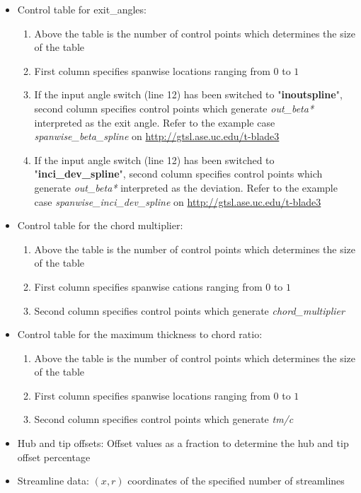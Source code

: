 \documentclass[8pt]{article}
\begin{document}
\begin{itemize}[leftmargin=*]
\begin{enumerate}[label=\alph*]
    \end{enumerate}
    \item Control table for exit\_angles:
    \begin{enumerate}[label=\alph*]
        \item Above the table is the number of control points which determines the size of the table
        \item First column specifies spanwise locations ranging from $0$ to $1$
        \item If the input angle switch (line 12) has been switched to "\textbf{inoutspline}", second column specifies control points which generate \textit{out\_beta*} interpreted as the exit angle. Refer to the example case \textit{spanwise\_beta\_spline} on \url{http://gtsl.ase.uc.edu/t-blade3}
        \item If the input angle switch (line 12) has been switched to "\textbf{inci\_dev\_spline}", second column specifies control points which generate \textit{out\_beta*} interpreted as the deviation. Refer to the example case \textit{spanwise\_inci\_dev\_spline} on \url{http://gtsl.ase.uc.edu/t-blade3}
    \end{enumerate}
    \item Control table for the chord multiplier:
    \begin{enumerate}[label=\alph*]
        \item Above the table is the number of control points which determines the size of the table
        \item First column specifies spanwise cations ranging from $0$ to $1$
        \item Second column specifies control points which generate \textit{chord\_multiplier}
    \end{enumerate}
    \item Control table for the maximum thickness to chord ratio:
    \begin{enumerate}[label=\alph*]
        \item Above the table is the number of control points which determines the size of the table
        \item First column specifies spanwise locations ranging from $0$ to $1$
        \item Second column specifies control points which generate \textit{tm/c}
    \end{enumerate}
    \item Hub and tip offsets: Offset values as a fraction to determine the hub and tip offset percentage
    \item Streamline data: $(x,r)$ coordinates of the specified number of streamlines
\end{itemize}
\end{document}
